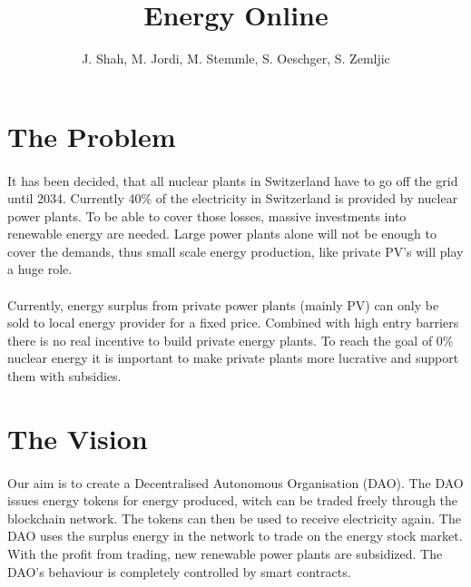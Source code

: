\documentclass{scrartcl}
\begin{document}
	
	\title{Energy Online}
	\subtitle{}
	\author{J. Shah, M. Jordi, M. Stemmle, S. Oeschger, S. Zemljic}
	
	\maketitle
	
	\section{The Problem}
	
	\paragraph{}
	It has been decided, that all nuclear plants in Switzerland have to go off the grid until 2034. Currently 40\% of the electricity in Switzerland is provided by nuclear power plants. To be able to cover those losses, massive investments into renewable energy are needed. Large power plants alone will not be enough to cover the demands, thus small scale energy production, like private PV's will play a huge role.
	
	\paragraph{}
	Currently, energy surplus from private power plants (mainly PV) can only be sold to local energy provider for a fixed price. Combined with high entry barriers there is no real incentive to build private energy plants.
	To reach the goal of 0\% nuclear energy it is important to make private plants more lucrative and support them with subsidies. 
	
	\section{The Vision}
	
	\paragraph{}
	Our aim is to create a Decentralised Autonomous Organisation (DAO). The DAO issues energy tokens for energy produced, witch can be traded freely through the blockchain network. The tokens can then be used to receive electricity again. The DAO uses the surplus energy in the network to trade on the energy stock market. With the profit from trading, new renewable power plants are subsidized. The DAO's behaviour is completely controlled by smart contracts.
	
\end{document}
